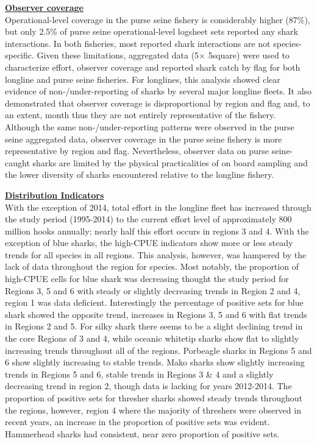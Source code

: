 \documentclass[12pt]{SCreport}
\begin{document}
\textbf{\underline{Observer coverage}}\\
Operational-level coverage in the purse seine fishery is considerably higher (87\%), but only 2.5\% of purse seine operational-level logsheet sets reported any shark interactions. In both fisheries, most reported shark interactions are not species-specific. Given these limitations, aggregated data (5\degree $\times$ 5\degree square) were used to characterize effort, observer coverage and reported shark catch by flag for both longline and purse seine fisheries. For longlines, this analysis showed clear evidence of non-/under-reporting of sharks by several major longline fleets. It also demonstrated that observer coverage is disproportional by region and flag and, to an extent, month thus they are not entirely representative of the fishery. Although the same non-/under-reporting patterns were observed in the purse seine aggregated data, observer coverage in the purse seine fishery is more representative by region and flag. Nevertheless, observer data on purse seine-caught sharks are limited by the physical practicalities of on board sampling and the lower diversity of sharks encountered relative to the longline fishery.

\textbf{\underline{Distribution Indicators}}\\
With the exception of 2014, total effort in the longline fleet has increased through the study period (1995-2014) to the current effort level of approximately 800 million hooks annually; nearly half this effort occurs in regions 3 and 4. With the exception of blue sharks, the high-CPUE indicators show more or less steady trends for all species in all regions. This analysis, however, was hampered by the lack of data throughout the region for species. Most notably, the proportion of high-CPUE cells for blue shark was decreasing thought the study period for Regions 3, 5 and 6 with steady or slightly decreasing trends in Region 2 and 4, region 1 was data deficient. Interestingly the percentage of positive sets for blue shark showed the opposite trend, increases in Regions 3, 5 and 6 with flat trends in Regions 2 and 5. For silky shark there seems to be a slight declining trend in the core Regions of 3 and 4, while oceanic whitetip sharks show flat to slightly increasing trends throughout all of the regions. Porbeagle sharks in Regions 5 and 6 show slightly increasing to stable trends. Mako sharks show slightly increasing trends in Regions 5 and 6, stable trends in Regions 3 \& 4 and a slightly decreasing trend in region 2, though data is lacking for years 2012-2014. The proportion of positive sets for thresher sharks showed steady trends throughout the regions, however, region 4 where the majority of threshers were observed in recent years, an increase in the proportion of positive sets was evident. Hammerhead sharks had consistent, near zero proportion of positive sets. 
\end{document}
